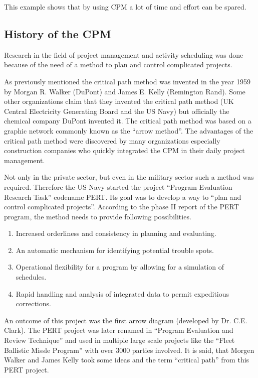 This example shows that by using CPM a lot of time and effort can be spared. 

\subsection{History of the CPM}

Research in the field of project management and activity scheduling was done because of the need of
a method to plan and control complicated projects. 

As previously mentioned the critical path method was invented in the year 1959 by Morgan R. Walker
(DuPont) and James E. Kelly (Remington Rand).  Some other organizations claim that they invented the
critical path method (UK Central Electricity Generating Board and the US Navy) but officially the
chemical company DuPont invented it. The critical path method was based on a graphic network
commonly known as the “arrow method”.  The advantages of the critical path method were discovered by
many organizations especially construction companies who quickly integrated the CPM in their daily
project management. 

Not only in the private sector, but even in the military sector such a method was required.
Therefore the US Navy started the project “Program Evaluation Research Task” codename PERT. Its goal
was to develop a way to “plan and control complicated projects”. According to the phase II report of
the PERT program, the method needs to provide following possibilities.

\begin{enumerate}
  \item Increased orderliness and consistency in planning and evaluating.
  \item An automatic mechanism for identifying potential trouble spots.
  \item Operational flexibility for a program by allowing for a simulation    of schedules.
  \item Rapid handling and analysis of integrated data to permit expeditious corrections.
\end{enumerate}

An outcome of this project was the first arrow diagram (developed by Dr. C.E. Clark). The PERT
project was later renamed in “Program Evaluation and Review Technique” and used in multiple large
scale projects like the “Fleet Ballistic Missle Program” with over 3000 parties involved. It is
said, that Morgen Walker and James Kelly took some ideas and the term “critical path” from this PERT
project\cite[p. 10]{obrien}.

